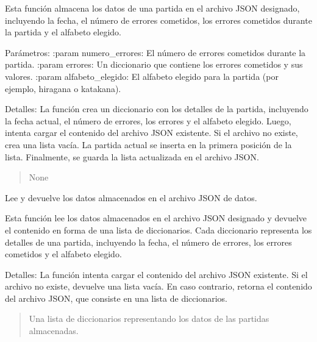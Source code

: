 \documentclass[letterpaper,10pt,spanish]{sphinxmanual}
\begin{document}
\begin{fulllineitems}
\begin{fulllineitems}
\sphinxAtStartPar
Esta función almacena los datos de una partida en el archivo JSON designado,
incluyendo la fecha, el número de errores cometidos, los errores cometidos
durante la partida y el alfabeto elegido.

\sphinxAtStartPar
Parámetros:
:param numero\_errores: El número de errores cometidos durante la partida.
:param errores: Un diccionario que contiene los errores cometidos y sus valores.
:param alfabeto\_elegido: El alfabeto elegido para la partida (por ejemplo, hiragana o katakana).

\sphinxAtStartPar
Detalles:
La función crea un diccionario  con los detalles de la partida, incluyendo la fecha
actual, el número de errores, los errores y el alfabeto elegido. Luego, intenta cargar
el contenido del archivo JSON existente. Si el archivo no existe, crea una lista vacía.
La partida actual se inserta en la primera posición de la lista. Finalmente, se guarda
la lista actualizada en el archivo JSON.
\begin{quote}\begin{description}
\sphinxAtStartPar
None

\end{description}\end{quote}

\end{fulllineitems}


\begin{fulllineitems}
\label{\detokenize{datos:datos.GestionDatos.leer_datos}}
\pysigstartsignatures
{}
\pysigstopsignatures
\sphinxAtStartPar
Lee y devuelve los datos almacenados en el archivo JSON de datos.

\sphinxAtStartPar
Esta función lee los datos almacenados en el archivo JSON designado y devuelve
el contenido en forma de una lista de diccionarios. Cada diccionario representa
los detalles de una partida, incluyendo la fecha, el número de errores, los errores
cometidos y el alfabeto elegido.

\sphinxAtStartPar
Detalles:
La función intenta cargar el contenido del archivo JSON existente. Si el archivo
no existe, devuelve una lista vacía. En caso contrario, retorna el contenido
del archivo JSON, que consiste en una lista de diccionarios.
\begin{quote}\begin{description}
\sphinxAtStartPar
Una lista de diccionarios representando los datos de las partidas almacenadas.


\end{description}
\end{quote}
\end{fulllineitems}
\end{fulllineitems}
\end{document}

